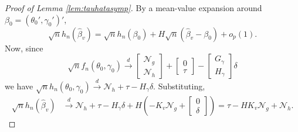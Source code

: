 \begin{proof}[Proof of Lemma \ref{lem:tauhatasymp}]
By a mean-value expansion around $\beta_0 = ( \theta_0', \gamma_0')'$,
\[
  \sqrt{n}h_n\left(\widehat{\beta}_v \right) = \sqrt{n}h_n(\beta_0) + H \sqrt{n} \left(\widehat{\beta}_v - \beta_0\right) + o_p(1).
\]
Now, since
\[
  \sqrt{n}f_n(\theta_0, \gamma_0) \overset{d}{\rightarrow} \left[\begin{array}{c} \mathscr{N}_g\\  \mathscr{N}_h\end{array}\right]+ \left[ \begin{array}{c} 0\\ \tau\end{array}\right] - \left[\begin{array}{c}G_\gamma\\ H_\gamma \end{array}\right]\delta
\]
we have $\sqrt{n}h_n(\theta_0, \gamma_0)\overset{d}{\rightarrow} \mathscr{N}_h + \tau - H_\gamma \delta$.
Substituting, 
	\begin{align*}
		\sqrt{n}h_n(\widehat{\beta}_v) &\overset{d}{\rightarrow}  \mathscr{N}_h + \tau - H_\gamma \delta+ H\left( -K_v \mathscr{N}_g + \left[\begin{array}{c} 0 \\ \delta \end{array} \right]\right)
			= \tau - HK_v \mathscr{N}_g + \mathscr{N}_h.
	\end{align*}
\end{proof}

